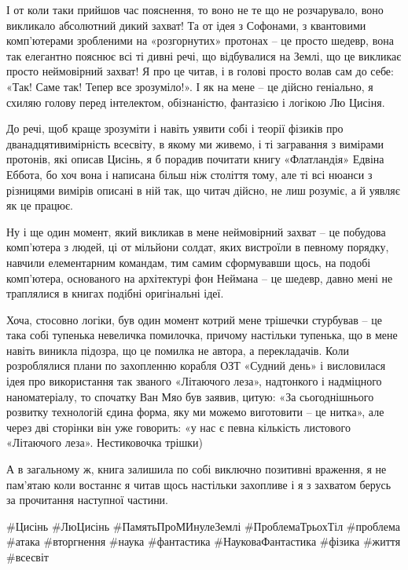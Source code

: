 І от коли таки прийшов час пояснення, то воно не те що не розчарувало, воно
викликало абсолютний дикий захват! Та от ідея з Софонами, з квантовими
комп'ютерами зробленими на «розгорнутих» протонах – це просто шедевр, вона так
елегантно пояснює всі ті дивні речі, що відбувалися на Землі, що це викликає
просто неймовірний захват! Я про це читав, і в голові просто волав сам до себе:
«Так! Саме так! Тепер все зрозуміло!». І як на мене – це дійсно геніально, я
схиляю голову перед інтелектом, обізнаністю, фантазією і логікою Лю Цисіня.

До речі, щоб краще зрозуміти і навіть уявити собі і теорії фізиків про
дванадцятивимірність всесвіту, в якому ми живемо, і ті загравання з вимірами
протонів, які описав Цисінь, я б порадив почитати книгу «Флатландія» Едвіна
Еббота, бо хоч вона і написана більш ніж століття тому, але ті всі нюанси з
різницями вимірів описані в ній так, що читач дійсно, не лиш розуміє, а й
уявляє як це працює.

Ну і ще один момент, який викликав в мене неймовірний захват – це побудова
комп'ютера з людей, ці от мільйони солдат, яких вистроїли в певному порядку,
навчили елементарним командам, тим самим сформувавши щось, на подобі
комп'ютера, основаного на архітектурі фон Неймана – це шедевр, давно мені не
траплялися в книгах подібні оригінальні ідеї.

Хоча, стосовно логіки, був один момент котрий мене трішечки стурбував – це така
собі тупенька невеличка помилочка, причому настільки тупенька, що в мене навіть
виникла підозра, що це помилка не автора, а перекладачів. Коли розроблялися
плани по захопленню корабля ОЗТ «Судний день» і висловилася ідея про
використання так званого «Літаючого леза», надтонкого і надміцного
наноматеріалу, то спочатку Ван Мяо був заявив, цитую: «За сьогоднішнього
розвитку технологій єдина форма, яку ми можемо виготовити – це нитка», але
через дві сторінки він уже говорить: «у нас є певна кількість листового
«Літаючого леза». Нестиковочка трішки)

А в загальному ж, книга залишила по собі виключно позитивні враження, я не
пам'ятаю коли востаннє я читав щось настільки захопливе і я з захватом берусь
за прочитання наступної частини.

\#Цисінь \#ЛюЦисінь \#ПамятьПроМИнулеЗемлі \#ПроблемаТрьохТіл \#проблема \#атака \#вторгнення \#наука \#фантастика \#НауковаФантастика \#фізика \#життя \#всесвіт
